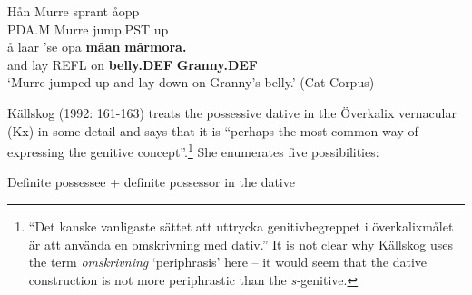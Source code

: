 
\ea\label{}
\gll Hån  Murre  sprant  åopp\\
PDA.M  Murre  jump.PST  up\\
\gll å  laar  ’se  opa  \textbf{måan}\textbf{  mårmora.}\\
and  lay  REFL  on  \textbf{belly.DEF} \textbf{Granny.DEF}\\
\glt ‘Murre jumped up and lay down on Granny’s belly.’ (Cat Corpus)
\z

Källskog (1992: 161-163) treats the possessive dative in the Överkalix vernacular (Kx) in some detail and says that it is “perhaps the most common way of expressing the genitive concept”.\footnote{ “Det kanske vanligaste sättet att uttrycka genitivbegreppet i överkalixmålet är att använda en omskrivning med dativ.” It is not clear why Källskog uses the term \textit{omskrivning} ‘periphrasis’ here – it would seem that the dative construction is not more periphrastic than the \textit{s-}genitive.} She enumerates five possibilities:


\item 

Definite possessee + definite possessor in the dative



\ea\label{}

\z 
\z 

\item 

